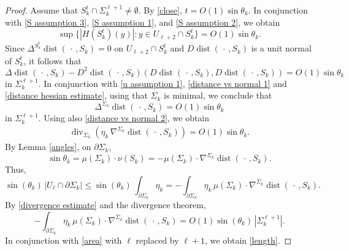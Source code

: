 \documentclass[11pt]{amsart}
\begin{document}
\begin{proof}
	  Assume that $S^t_k\cap \Sigma^{\ell+1}_k\neq \emptyset$.  By \eqref{close}, $t=O(1)\sin\theta_k$. In conjunction with \eqref{S assumption 3}, \eqref{S assumption 1}, and \eqref{S assumption 2},  we obtain  
	 $$ 	\sup\{|H(S^t_k)(y)|:y\in U_{\ell+2}\cap S^t_k\}=O(1)\sin\theta_k.$$  Since $\Delta^{S^t_k}\operatorname{dist}(\,\cdot\,,S_k)=0$ on $U_{\ell+2}\cap S^t_k$ and $D\operatorname{dist}(\,\cdot\,,S_k)$ is a unit normal of $S^t_k$, it follows that
		$$
		\Delta \operatorname{dist}(\,\cdot\,,S_k)-D^2\operatorname{dist}(\,\cdot\,,S_k)(D\operatorname{dist}(\,\cdot\,,S_k),D\operatorname{dist}(\,\cdot\,,S_k))=O(1)\sin\theta_k
		$$
in $\Sigma^{\ell+1}_k$. 		In conjunction with \eqref{u assumption 1}, \eqref{distance vs normal 1} and \eqref{distance hessian estimate}, using that $\Sigma_k$ is minimal, we conclude that  $$\Delta^{\Sigma_k}\operatorname{dist}(\,\cdot\,,S_k)=O(1)\sin\theta_k$$ in $\Sigma^{\ell+1}_k$. Using also \eqref{distance vs normal 2}, we obtain
		\begin{align} \label{divergence estimate} 
		\operatorname{div}_{\Sigma_k}\left(\eta_k\,\nabla^{\Sigma_k}\operatorname{dist}(\,\cdot\,,S_k)\right)=O(1)\sin\theta_k.
		\end{align} 
	By Lemma \ref{angles}, 	
		 on $\partial \Sigma_k$, 
		$$
		\sin\theta_k=\mu(\Sigma_k)\cdot\nu(S_k) =-\mu(\Sigma_k)\cdot \nabla^{\Sigma_k}\operatorname{dist}(\,\cdot\,,S_k).
		$$
		Thus, 
	$$
	\sin(\theta_k)\,|U_\ell\cap \partial \Sigma_k|\leq \sin(\theta_k)\,\int_{\partial  \Sigma_k}\eta_k=-\int_{\partial  \Sigma_k}\eta_k\,\mu(\Sigma_k)\cdot \nabla^{\Sigma_k}\operatorname{dist}(\,\cdot\,,S_k).
	$$
	By \eqref{divergence estimate} and the divergence theorem,
	$$
	-\int_{\partial  \Sigma_k}\eta_k\,\mu(\Sigma_k)\cdot\nabla^{\Sigma_k} \operatorname{dist}(\,\cdot\,,S_k)=O(1)\sin(\theta_k)\,|\Sigma_k^{\ell+1}|.
	$$
	In conjunction with \eqref{area} with $\ell$ replaced by $\ell+1$, we obtain \eqref{length}. 
	

\end{proof}
\end{document}

